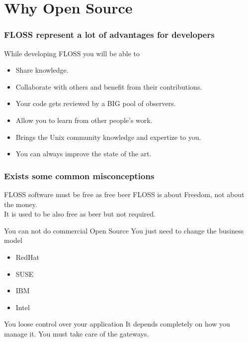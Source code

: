 \documentclass[hyperref={pdfpagelabels=false},xcolor=pst,pdf,fragile]{beamer}
\begin{document}
\section{Why Open Source}

\begin{frame}
  \frametitle{FLOSS represent a lot of advantages for developers}

  While developing FLOSS you will be able to
  \begin{itemize}
	\item Share knowledge.
	\item Collaborate with others and benefit from their contributions.
	\item Your code gets reviewed by a BIG pool of observers.
	\pause
	\item Allow you to learn from other people's work.
	\item Brings the Unix community knowledge and expertize to you.
	\item You can always improve the state of the art.
  \end{itemize}

\end{frame}

\begin{frame}
  \frametitle{Exists some common misconceptions}

  \begin{block}{FLOSS software must be free as free beer}
	  FLOSS is about Freedom, not about the money.\\

	  It is used to be also free as beer but not required.
  \end{block}

  \pause
  \begin{block}{You can not do commercial Open Source}
	  You just need to change the business model
	\begin{itemize}
	  \item RedHat
	  \item SUSE
	  \item IBM
	  \item Intel
	\end{itemize}
  \end{block}

  \pause
  \begin{block}{You loose control over your application}
	It depends completely on how you manage it. You must take care of the
	gateways.
  \end{block}

\end{frame}
\end{document}
